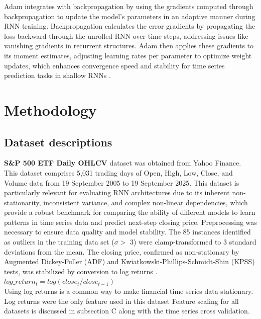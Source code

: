 \documentclass[conference, 10pt]{IEEEtran}
\begin{document}
Adam integrates with backpropagation by using the gradients computed through backpropagation to update the model's
parameters in an adaptive manner during RNN training. Backpropagation calculates the error gradients by propagating the
loss backward through the unrolled RNN over time steps, addressing issues like vanishing gradients in recurrent
structures. Adam then applies these gradients to its moment estimates, adjusting learning rates per parameter to
optimize weight updates, which enhances convergence speed and stability for time series prediction tasks in shallow RNNs \cite{machinelearningmasteryGentleIntroduction}.

\section{Methodology}
\subsection{Dataset descriptions}

\textbf{S\&P 500 ETF Daily OHLCV} dataset was obtained from Yahoo Finance. This dataset comprises 5,031 trading days of
Open, High, Low, Close, and Volume data from 19 September 2005 to 19 September 2025. This dataset is particularly
relevant for evaluating RNN architectures due to its inherent non-stationarity, inconsistent variance, and complex
non-linear dependencies, which provide a robust benchmark for comparing the ability of different models to learn
patterns in time series data and predict next-step closing price. Preprocessing was necessary to ensure data quality and
model stability. The 85 instances identified as outliers in the training data set ($\sigma >$ 3) were clamp-transformed
to 3 standard deviations from the mean. The closing price, confirmed as non-stationary by Augmented Dickey-Fuller (ADF)
and Kwiatkowski-Phillips-Schmidt-Shin (KPSS) tests, was stabilized by conversion to log returns
\cite{StationarityTests}.\\

$log\_return_t = log(close_t / close_{t-1})$\\

Using log returns is a common way to make financial time series data stationary. Log returns were the only feature used
in this dataset Feature scaling for all datasets is discussed in subsection C along with the time series cross
validation.
\end{document}
